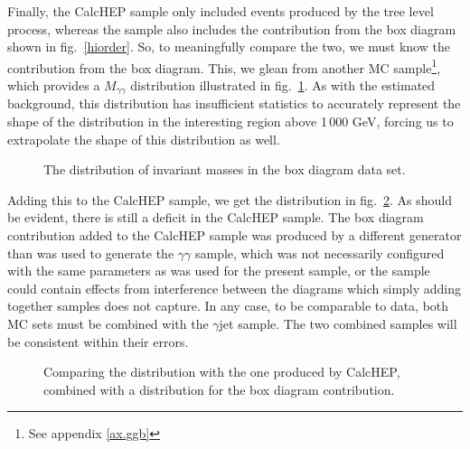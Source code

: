 Finally, the CalcHEP sample only included events produced by the tree level process, whereas the \atlas{} sample also includes the contribution from the box diagram shown in fig.~\ref{hiorder}. So, to meaningfully compare the two, we must know the contribution from the box diagram. This, we glean from another \atlas{} MC sample\footnote{See appendix \ref{ax.ggb}}, which provides a $M_{\gamma\gamma}$ distribution illustrated in fig.~\ref{boxmgg}. As with the estimated background, this distribution has insufficient statistics to accurately represent the shape of the distribution in the interesting region above 1\,000 GeV, forcing us to extrapolate the shape of this distribution as well.

\begin{figure}[htp]
\begin{minipage}[b]{.69\textwidth}
\begin{infilsf} \tiny

\end{infilsf}
\end{minipage}
\begin{minipage}[b]{.3\textwidth}
\caption{The distribution of invariant masses in the \atlas{} box diagram data set.}\label{boxmgg}
\end{minipage}
\end{figure}

Adding this to the CalcHEP sample, we get the distribution in fig.~\ref{ggcomp}. As should be evident, there is still a deficit in the CalcHEP sample. The box diagram contribution added to the CalcHEP sample was produced by a different generator than was used to generate the \atlas{} $\gamma\gamma$ sample, which was not necessarily configured with the same parameters as was used for the present sample, or the \altas{} sample could contain effects from interference between the diagrams which simply adding together samples does not capture. In any case, to be comparable to data, both MC sets must be combined with the $\gamma$jet sample. The two combined samples will be consistent within their errors.

\begin{figure}[htp]
\begin{minipage}[b]{.69\textwidth}
\begin{infilsf} \tiny

\end{infilsf}
\end{minipage}
\begin{minipage}[b]{.3\textwidth}
\caption{Comparing the \atlas{} distribution with the one produced by CalcHEP, combined with a distribution for the box diagram contribution.}\label{ggcomp}
\end{minipage}
\end{figure}

